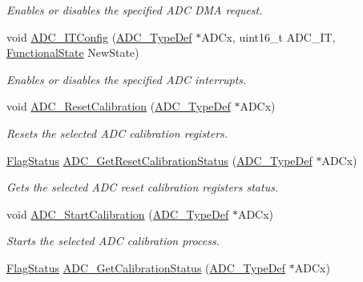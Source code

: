\begin{DoxyCompactItemize}
\begin{DoxyCompactList}\small\item\em Enables or disables the specified A\+DC D\+MA request. \end{DoxyCompactList}\item 
void \hyperlink{group___a_d_c___exported___functions_gad4c84b54b539944f555488bf979f82b6}{A\+D\+C\+\_\+\+I\+T\+Config} (\hyperlink{struct_a_d_c___type_def}{A\+D\+C\+\_\+\+Type\+Def} $\ast$A\+D\+Cx, uint16\+\_\+t A\+D\+C\+\_\+\+IT, \hyperlink{group___exported__types_gac9a7e9a35d2513ec15c3b537aaa4fba1}{Functional\+State} New\+State)
\begin{DoxyCompactList}\small\item\em Enables or disables the specified A\+DC interrupts. \end{DoxyCompactList}\item 
void \hyperlink{group___a_d_c___exported___functions_ga3d542020ba28c1d16238a0defbee6d8f}{A\+D\+C\+\_\+\+Reset\+Calibration} (\hyperlink{struct_a_d_c___type_def}{A\+D\+C\+\_\+\+Type\+Def} $\ast$A\+D\+Cx)
\begin{DoxyCompactList}\small\item\em Resets the selected A\+DC calibration registers. \end{DoxyCompactList}\item 
\hyperlink{group___exported__types_ga89136caac2e14c55151f527ac02daaff}{Flag\+Status} \hyperlink{group___a_d_c___exported___functions_ga113be9fe25add8d7496bed659c68e02b}{A\+D\+C\+\_\+\+Get\+Reset\+Calibration\+Status} (\hyperlink{struct_a_d_c___type_def}{A\+D\+C\+\_\+\+Type\+Def} $\ast$A\+D\+Cx)
\begin{DoxyCompactList}\small\item\em Gets the selected A\+DC reset calibration registers status. \end{DoxyCompactList}\item 
void \hyperlink{group___a_d_c___exported___functions_gadcba6341124a6aabfd2dd885ca8e5f14}{A\+D\+C\+\_\+\+Start\+Calibration} (\hyperlink{struct_a_d_c___type_def}{A\+D\+C\+\_\+\+Type\+Def} $\ast$A\+D\+Cx)
\begin{DoxyCompactList}\small\item\em Starts the selected A\+DC calibration process. \end{DoxyCompactList}\item 
\hyperlink{group___exported__types_ga89136caac2e14c55151f527ac02daaff}{Flag\+Status} \hyperlink{group___a_d_c___exported___functions_ga7a728f699b487c7fa1694d7424967122}{A\+D\+C\+\_\+\+Get\+Calibration\+Status} (\hyperlink{struct_a_d_c___type_def}{A\+D\+C\+\_\+\+Type\+Def} $\ast$A\+D\+Cx)

\end{DoxyCompactItemize}
